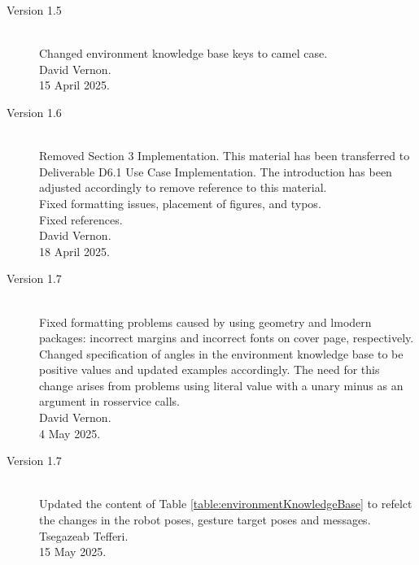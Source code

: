 \documentclass{CSSRforAfrica}
\begin{document}
\begin{description}
\item [Version 1.5]~\\
Changed environment knowledge base keys to camel case.\\
David Vernon.\\
15 April 2025.   

\newpage
\item [Version 1.6]~\\
Removed Section 3 Implementation. This material has been transferred to Deliverable D6.1 Use Case Implementation. The introduction has been adjusted accordingly to remove reference to this material.\\
Fixed formatting issues, placement of figures, and typos. \\
Fixed references.\\
David Vernon.\\
18 April 2025.  

\item [Version 1.7]~\\
Fixed formatting problems caused by using geometry and lmodern packages: incorrect margins and incorrect fonts on cover page, respectively. \\
Changed specification of angles in the environment knowledge base to be positive values and updated examples accordingly. The need for this change arises from problems using  literal value with a unary minus as an argument in rosservice calls. \\
David Vernon.\\
4 May 2025.  

\item [Version 1.7]~\\
Updated the content of Table \ref{table:environmentKnowledgeBase} to refelct the changes in the robot poses, gesture target poses and messages. \\
Tsegazeab Tefferi.\\
15 May 2025.  

\end{description}
\end{document}
